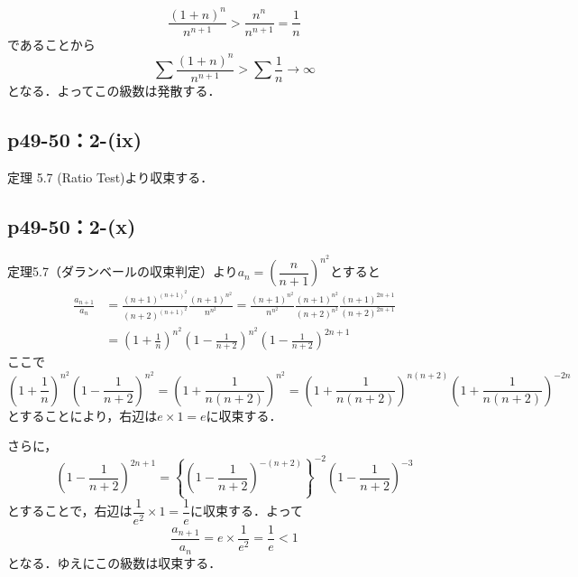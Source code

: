 \documentclass[uplatex,dvipdfmx,a4paper,10pt,fleqn]{jsarticle}
\begin{document}
        \begin{screen}
        \[
        \frac{(1+n)^n}{n^{n+1}}>\frac{n^n}{n^{n+1}}=\frac{1}{n}
        \]
        であることから
        \[
        \sum \frac{(1+n)^n}{n^{n+1}}>\sum \frac{1}{n} \rightarrow \infty
        \]
        となる．よってこの級数は発散する．
        \end{screen}
        

        \subsection*{p49-50：2-(ix)}

        \begin{screen}
            定理 5.7 (Ratio Test)より収束する．
        \end{screen}

        \subsection*{p49-50：2-(x)}

        \begin{screen}
        定理5.7（ダランベールの収束判定）より$a_n=\left(\dfrac{n}{n+1}\right)^{n^2}$とすると
        \begin{align*}
        \frac{a_{n+1}}{a_n}&=\frac{(n+1)^{(n+1)^2}}{(n+2)^{(n+1)^2}}\frac{(n+1)^{n^2}}{n^{n^2}}=\frac{(n+1)^{n^2}}{n^{n^2}}\frac{(n+1)^{n^2}}{(n+2)^{n^2}}\frac{(n+1)^{2n+1}}{(n+2)^{2n+1}}\\
        &=\left(1+\frac{1}{n}\right)^{n^2}\left(1-\frac{1}{n+2}\right)^{n^2}\left(1-\frac{1}{n+2}\right)^{2n+1}
        \end{align*}
        ここで
        \[
        \left(1+\frac{1}{n}\right)^{n^2}\left(1-\frac{1}{n+2}\right)^{n^2}=\left(1+\frac{1}{n(n+2)}\right)^{n^2}=\left(1+\frac{1}{n(n+2)}\right)^{n(n+2)}\left(1+\frac{1}{n(n+2)}\right)^{-2n}
        \]
        とすることにより，右辺は$e \times 1=e$に収束する．
        
        さらに，
        \[
        \left(1-\frac{1}{n+2}\right)^{2n+1}=\left\{\left(1-\frac{1}{n+2}\right)^{-(n+2)}\right\}^{-2}\left(1-\frac{1}{n+2}\right)^{-3}
        \]
        とすることで，右辺は$\dfrac{1}{e^2} \times 1=\dfrac{1}{e}$に収束する．よって
        \[
        \frac{a_{n+1}}{a_n}=e \times \frac{1}{e^2}=\frac{1}{e}<1
        \]
        となる．ゆえにこの級数は収束する．
    \end{screen}
\end{document}
